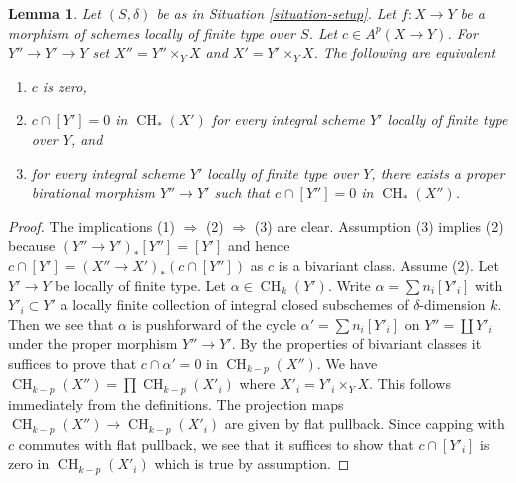 \documentclass[10pt,a4paper]{amsart}
\theoremstyle{plain}
\newtheorem{lemma}[subsection]{Lemma}
\theoremstyle{definition}
\theoremstyle{remark}
\numberwithin{equation}{subsection}
\def\CH{\mathop{\mathrm{CH}}\nolimits}
\begin{document}
\begin{lemma}
\label{lemma-bivariant-zero}
Let $(S, \delta)$ be as in Situation \ref{situation-setup}.
Let $f : X \to Y$ be a morphism of schemes locally of finite type over $S$.
Let $c \in A^p(X \to Y)$. For $Y'' \to Y' \to Y$ set
$X'' = Y'' \times_Y X$ and $X' = Y' \times_Y X$.
The following are equivalent
\begin{enumerate}
\item $c$ is zero,
\item $c \cap [Y'] = 0$ in $\CH_*(X')$ for every integral scheme $Y'$
locally of finite type over $Y$, and
\item for every integral scheme $Y'$ locally of finite type over $Y$,
there exists a proper birational morphism $Y'' \to Y'$ such that
$c \cap [Y''] = 0$ in $\CH_*(X'')$.
\end{enumerate}
\end{lemma}

\begin{proof}
The implications (1) $\Rightarrow$ (2) $\Rightarrow$ (3) are clear.
Assumption (3) implies (2) because $(Y'' \to Y')_*[Y''] = [Y']$
and hence $c \cap [Y'] = (X'' \to X')_*(c \cap [Y''])$ as $c$
is a bivariant class. Assume (2).
Let $Y' \to Y$ be locally of finite type. Let $\alpha \in \CH_k(Y')$.
Write $\alpha = \sum n_i [Y'_i]$ with $Y'_i \subset Y'$ a locally finite
collection of integral closed subschemes of $\delta$-dimension $k$.
Then we see that $\alpha$ is pushforward of the cycle
$\alpha' = \sum n_i[Y'_i]$ on $Y'' = \coprod Y'_i$ under the
proper morphism $Y'' \to Y'$. By the properties of bivariant
classes it suffices to prove that $c \cap \alpha' = 0$ in $\CH_{k - p}(X'')$.
We have $\CH_{k - p}(X'') = \prod \CH_{k - p}(X'_i)$ where
$X'_i = Y'_i \times_Y X$. This follows immediately
from the definitions. The projection maps
$\CH_{k - p}(X'') \to \CH_{k - p}(X'_i)$ are given by flat pullback.
Since capping with $c$ commutes with
flat pullback, we see that it suffices to show that $c \cap [Y'_i]$
is zero in $\CH_{k - p}(X'_i)$ which is true by assumption.
\end{proof}
\end{document}
